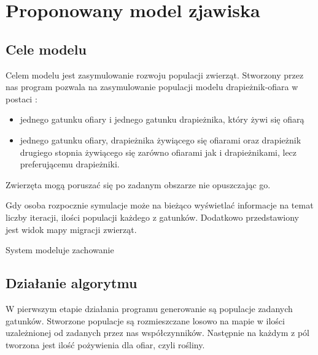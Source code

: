  \chapter{Proponowany model zjawiska}

\section{Cele modelu}
Celem modelu jest zasymulowanie rozwoju populacji zwierząt. Stworzony przez nas program pozwala na zasymulowanie populacji modelu drapieżnik-ofiara w postaci :
\begin{itemize}
	\item jednego gatunku ofiary i  jednego gatunku drapieżnika, który żywi się ofiarą
	\item jednego gatunku ofiary,  drapieżnika żywiącego się ofiarami oraz drapieżnik drugiego stopnia żywiącego się zarówno ofiarami jak i drapieżnikami, lecz preferującemu drapieżniki.
\end{itemize}
 
Zwierzęta mogą poruszać się po zadanym obszarze nie opuszczając go. 

Gdy osoba rozpocznie symulacje może na bieżąco wyświetlać informacje na temat liczby iteracji, ilości populacji każdego z gatunków. Dodatkowo przedstawiony jest widok mapy migracji zwierząt.

System modeluje zachowanie 

\section{Działanie algorytmu} 
W pierwszym etapie działania programu generowanie są populacje zadanych gatunków. Stworzone populacje są rozmieszczane losowo na mapie w ilości uzależnionej od zadanych przez nas współczynników. Następnie na każdym z pól tworzona jest ilość pożywienia dla ofiar, czyli rośliny. 

